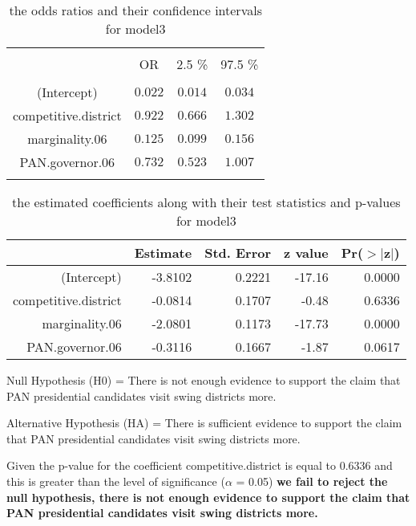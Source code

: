 \documentclass[12pt,letterpaper]{article}
\begin{document}
\begin{enumerate}
\vspace{4cm}

\begin{table}[!htbp] \centering 
	\caption{the odds ratios and their confidence intervals for model3} 
	\label{} 
	\begin{tabular}{@{\extracolsep{5pt}} cccc} 
		\\[-1.8ex]\hline 
		\hline \\[-1.8ex] 
		& OR & 2.5 \% & 97.5 \% \\ 
		\hline \\[-1.8ex] 
		(Intercept) & $0.022$ & $0.014$ & $0.034$ \\ 
		competitive.district & $0.922$ & $0.666$ & $1.302$ \\ 
		marginality.06 & $0.125$ & $0.099$ & $0.156$ \\ 
		PAN.governor.06 & $0.732$ & $0.523$ & $1.007$ \\ 
		\hline \\[-1.8ex] 
	\end{tabular} 
\end{table} 

\vspace{1cm}

\begin{table}[ht]
	\centering
		\caption{the estimated coefficients along with their test statistics and p-values for model3} 
	\label{} 
	\begin{tabular}{rrrrr}
		\hline
		& Estimate & Std. Error & z value & Pr($>$$|$z$|$) \\ 
		\hline
		(Intercept) & -3.8102 & 0.2221 & -17.16 & 0.0000 \\ 
		competitive.district & -0.0814 & 0.1707 & -0.48 & 0.6336 \\ 
		marginality.06 & -2.0801 & 0.1173 & -17.73 & 0.0000 \\ 
		PAN.governor.06 & -0.3116 & 0.1667 & -1.87 & 0.0617 \\ 
		\hline
	\end{tabular}
\end{table}



Null Hypothesis (H0) = There is not enough evidence to support the claim that PAN presidential candidates visit swing districts more.

Alternative Hypothesis (HA) = There is sufficient evidence to support the claim that PAN presidential candidates visit swing districts more.

Given the p-value for the coefficient competitive.district is equal to 0.6336 and this is greater than the level of significance ($\alpha$ = 0.05) \textbf{we fail to reject the null hypothesis, there is not enough evidence to support the claim that PAN presidential candidates visit swing districts more.}


\end{enumerate}
\end{document}
